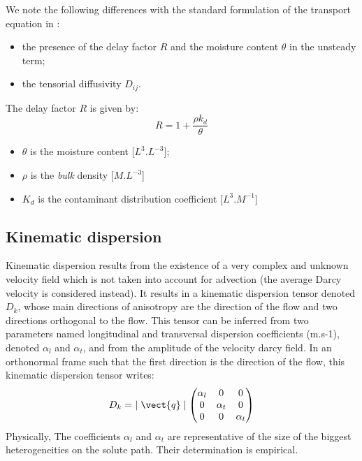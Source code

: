 We note the following differences with the standard formulation of the transport equation in \CS:
\begin {itemize}
 \item[$\bullet$] the presence of the delay factor $R$ and the moisture content $\theta$ in the unsteady term;
 \item[$\bullet$] the tensorial diffusivity $D_{ij}$.
\end{itemize}
The delay factor $R$ is given by:
\begin{equation}\label{k_d}
R = 1 + \frac{\rho k_d}{\theta}
\end{equation}
\begin {itemize}
 \item[$\bullet$] $\theta$ is the moisture content [$L^3.L^{-3}$];
 \item[$\bullet$] $\rho$ is the \textit{bulk} density [$M.L^{-3}$]
 \item[$\bullet$] $K_d$ is the contaminant distribution coefficient [$L^3.M^{-1}$]
\end{itemize}

\subsection{Kinematic dispersion}
%
Kinematic dispersion results from the existence of a very complex and unknown velocity field which is
not taken into account for advection (the average Darcy velocity is considered instead).
It results in a kinematic dispersion tensor denoted $D_k$, whose main directions of anisotropy are the direction of the flow and
two directions orthogonal to the flow. This tensor can be inferred from two parameters named longitudinal and transversal dispersion coefficients (m.s-1),
denoted $\alpha_l$ and $\alpha_t$, and from the amplitude of the velocity darcy field.
In an orthonormal frame such that the first direction is the direction of the flow, this
kinematic dispersion tensor writes:
\begin{equation}
\label{eq:groundwater:dispersion_tensor}
D_k = \ \mid \vect{q} \mid
\begin{pmatrix}
\alpha_l & 0 & 0 \\
0 & \alpha_t & 0 \\
0 & 0 & \alpha_t
\end{pmatrix}
\end{equation}
Physically, The coefficients $\alpha_l$ and $\alpha_t$ are representative of the size of the biggest heterogeneities on the solute path. Their
determination is empirical.

